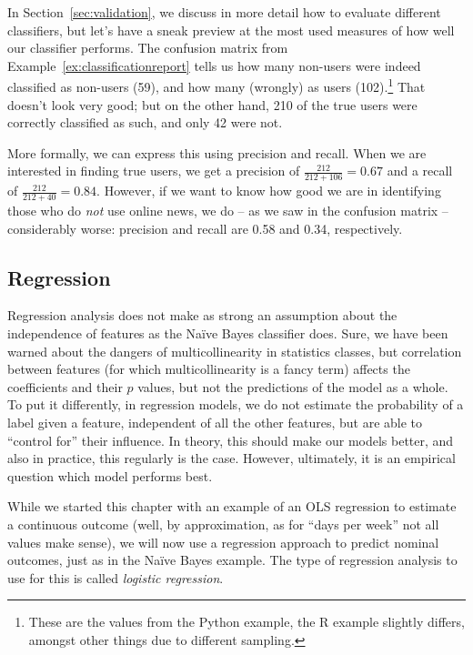 In Section~\ref{sec:validation}, we discuss in more detail how to
evaluate different classifiers, but let's have a sneak preview at the most used
measures of how well our classifier performs.
The confusion matrix from Example~\ref{ex:classificationreport} tells us how many non-users were indeed
classified as non-users (59), and how many (wrongly) as users
(102).\footnote{These are the values from the Python example, the R
  example slightly differs, amongst other things due to different
  sampling.} That doesn't look very good; but on the other hand, 210
of the true users were correctly classified as such, and only 42 were
not.

More formally, we can express this using precision and recall. When we
are interested in finding true users, we get a precision of $\frac{212}{212+106} = 0.67$
 and a recall of $\frac{212}{212+40} = 0.84$.
However, if we want to know how good we are in identifying those who
do \emph{not} use online news, we do -- as we saw in the confusion
matrix -- considerably worse: precision and recall are 0.58 and 0.34,
respectively.



\subsection{Regression}
\label{subsec:regression}

Regression analysis does not make as strong an assumption about the
independence of features as the Na\"ive Bayes classifier does.  Sure,
we have been warned about the dangers of multicollinearity in
statistics classes, but correlation between features (for which
multicollinearity is a fancy term) affects the coefficients and their
$p$ values, but not the predictions of the model as a whole.   To put
it differently, in regression models, we do not estimate the
probability of a label given a feature, independent of all the other
features, but are able to ``control for'' their influence.  In theory,
this should make our models better, and also in practice, this
regularly is the case. However, ultimately, it is an empirical
question which model performs best.

While we started this chapter with an example of an OLS regression to
estimate a continuous outcome (well, by approximation, as for ``days
per week'' not all values make sense), we will now use a regression
approach to predict nominal outcomes, just as in the Na\"ive Bayes
example.  The type of regression analysis to use for this is called
\emph{logistic regression}.

